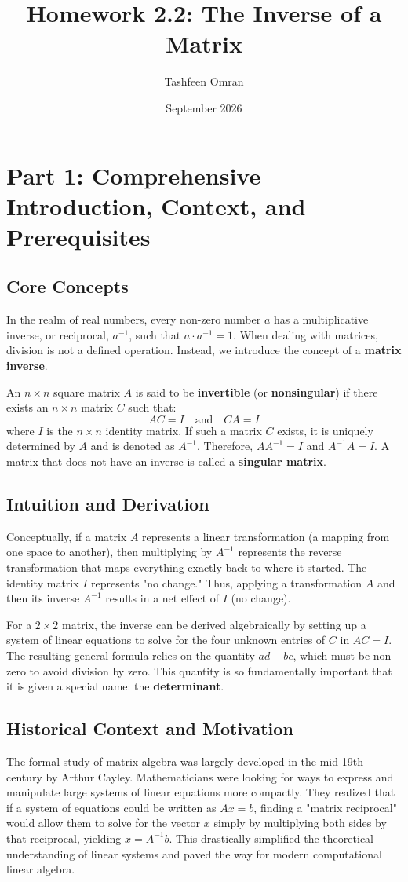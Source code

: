 \documentclass[12pt]{article}
\title{Homework 2.2: The Inverse of a Matrix}
\author{Tashfeen Omran}
\date{September 2026}
\begin{document}
\maketitle
\tableofcontents
\newpage

\section{Part 1: Comprehensive Introduction, Context, and Prerequisites}

\subsection{Core Concepts}
In the realm of real numbers, every non-zero number $a$ has a multiplicative inverse, or reciprocal, $a^{-1}$, such that $a \cdot a^{-1} = 1$. When dealing with matrices, division is not a defined operation. Instead, we introduce the concept of a \textbf{matrix inverse}. 

An $n \times n$ square matrix $A$ is said to be \textbf{invertible} (or \textbf{nonsingular}) if there exists an $n \times n$ matrix $C$ such that:
\[ AC = I \quad \text{and} \quad CA = I \]
where $I$ is the $n \times n$ identity matrix. If such a matrix $C$ exists, it is uniquely determined by $A$ and is denoted as $A^{-1}$. Therefore, $AA^{-1} = I$ and $A^{-1}A = I$. A matrix that does not have an inverse is called a \textbf{singular matrix}.

\subsection{Intuition and Derivation}
Conceptually, if a matrix $A$ represents a linear transformation (a mapping from one space to another), then multiplying by $A^{-1}$ represents the reverse transformation that maps everything exactly back to where it started. The identity matrix $I$ represents "no change." Thus, applying a transformation $A$ and then its inverse $A^{-1}$ results in a net effect of $I$ (no change).

For a $2 \times 2$ matrix, the inverse can be derived algebraically by setting up a system of linear equations to solve for the four unknown entries of $C$ in $AC=I$. The resulting general formula relies on the quantity $ad-bc$, which must be non-zero to avoid division by zero. This quantity is so fundamentally important that it is given a special name: the \textbf{determinant}.

\subsection{Historical Context and Motivation}
The formal study of matrix algebra was largely developed in the mid-19th century by Arthur Cayley. Mathematicians were looking for ways to express and manipulate large systems of linear equations more compactly. They realized that if a system of equations could be written as $Ax = b$, finding a "matrix reciprocal" would allow them to solve for the vector $x$ simply by multiplying both sides by that reciprocal, yielding $x = A^{-1}b$. This drastically simplified the theoretical understanding of linear systems and paved the way for modern computational linear algebra.
\end{document}
